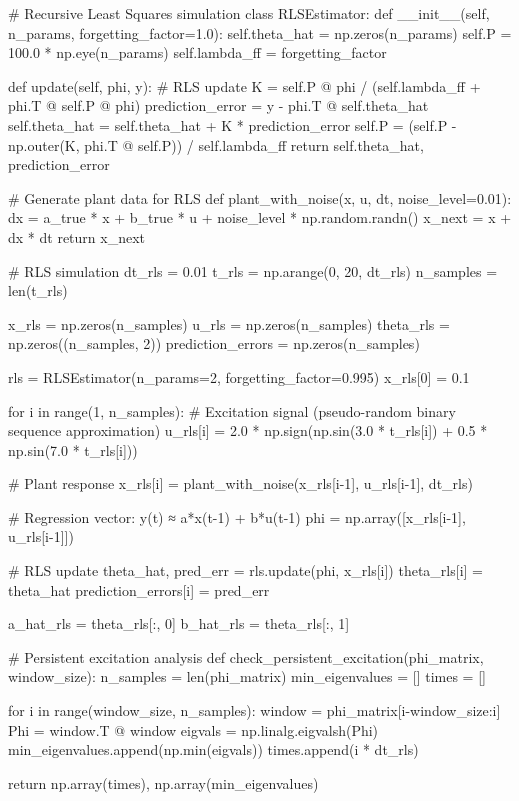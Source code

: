 \documentclass[a4paper, 11pt]{article}
\begin{document}
\begin{pycode}
# Recursive Least Squares simulation
class RLSEstimator:
    def __init__(self, n_params, forgetting_factor=1.0):
        self.theta_hat = np.zeros(n_params)
        self.P = 100.0 * np.eye(n_params)
        self.lambda_ff = forgetting_factor

    def update(self, phi, y):
        # RLS update
        K = self.P @ phi / (self.lambda_ff + phi.T @ self.P @ phi)
        prediction_error = y - phi.T @ self.theta_hat
        self.theta_hat = self.theta_hat + K * prediction_error
        self.P = (self.P - np.outer(K, phi.T @ self.P)) / self.lambda_ff
        return self.theta_hat, prediction_error

# Generate plant data for RLS
def plant_with_noise(x, u, dt, noise_level=0.01):
    dx = a_true * x + b_true * u + noise_level * np.random.randn()
    x_next = x + dx * dt
    return x_next

# RLS simulation
dt_rls = 0.01
t_rls = np.arange(0, 20, dt_rls)
n_samples = len(t_rls)

x_rls = np.zeros(n_samples)
u_rls = np.zeros(n_samples)
theta_rls = np.zeros((n_samples, 2))
prediction_errors = np.zeros(n_samples)

rls = RLSEstimator(n_params=2, forgetting_factor=0.995)
x_rls[0] = 0.1

for i in range(1, n_samples):
    # Excitation signal (pseudo-random binary sequence approximation)
    u_rls[i] = 2.0 * np.sign(np.sin(3.0 * t_rls[i]) + 0.5 * np.sin(7.0 * t_rls[i]))

    # Plant response
    x_rls[i] = plant_with_noise(x_rls[i-1], u_rls[i-1], dt_rls)

    # Regression vector: y(t) ≈ a*x(t-1) + b*u(t-1)
    phi = np.array([x_rls[i-1], u_rls[i-1]])

    # RLS update
    theta_hat, pred_err = rls.update(phi, x_rls[i])
    theta_rls[i] = theta_hat
    prediction_errors[i] = pred_err

a_hat_rls = theta_rls[:, 0]
b_hat_rls = theta_rls[:, 1]

# Persistent excitation analysis
def check_persistent_excitation(phi_matrix, window_size):
    n_samples = len(phi_matrix)
    min_eigenvalues = []
    times = []

    for i in range(window_size, n_samples):
        window = phi_matrix[i-window_size:i]
        Phi = window.T @ window
        eigvals = np.linalg.eigvalsh(Phi)
        min_eigenvalues.append(np.min(eigvals))
        times.append(i * dt_rls)

    return np.array(times), np.array(min_eigenvalues)


\end{pycode}
\end{document}
